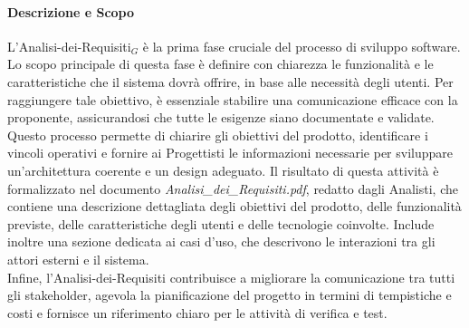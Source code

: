 \documentclass[10pt]{article}
\begin{document}
\begin{justify}
        \paragraph{Descrizione e Scopo}
        L’Analisi-dei-Requisiti$_G$ è la prima fase cruciale del processo di sviluppo software. Lo scopo principale di questa fase è definire con chiarezza le funzionalità e le caratteristiche che il sistema dovrà offrire, in base alle necessità degli utenti. Per raggiungere tale obiettivo, è essenziale stabilire una comunicazione efficace con la proponente, assicurandosi che tutte le esigenze siano documentate e validate. Questo processo permette di chiarire gli obiettivi del prodotto, identificare i vincoli operativi e fornire ai Progettisti le informazioni necessarie per sviluppare un’architettura coerente e un design adeguato. Il risultato di questa attività è formalizzato nel documento \textit{Analisi\_dei\_Requisiti.pdf}, redatto dagli Analisti, che contiene una descrizione dettagliata degli obiettivi del prodotto, delle funzionalità previste, delle caratteristiche degli utenti e delle tecnologie coinvolte. Include inoltre una sezione dedicata ai casi d’uso, che descrivono le interazioni tra gli attori esterni e il sistema.\\
        Infine, l’Analisi-dei-Requisiti contribuisce a migliorare la comunicazione tra tutti gli stakeholder, agevola la pianificazione del progetto in termini di tempistiche e costi e fornisce un riferimento chiaro per le attività di verifica e test.\\


\end{justify}
\end{document}
